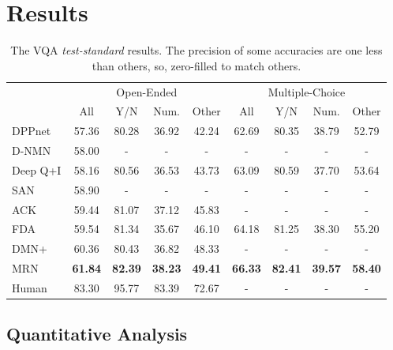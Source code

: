 \documentclass{article}
\begin{document}
\section{Results}
\label{sec:results}

\begin{table}[t!]
\caption{The VQA \textit{test-standard} results. The precision of some accuracies \cite{Yang2015,Andreas2016} are one less than others, so, zero-filled to match others.}
\label{tab:results-std}
\centering
\begin{tabular}{l c c c c c c c c}
\toprule
& \multicolumn{4}{c}{Open-Ended} & \multicolumn{4}{c}{ Multiple-Choice} \\
\cmidrule{2-5}
\cmidrule{6-9}
 & All & Y/N & Num. & Other & All & Y/N & Num. & Other \\
\midrule
DPPnet \cite{Noh2015} \hspace{7pt}
         & 57.36 & 80.28 & 36.92 & 42.24
         & 62.69 & 80.35 & 38.79 & 52.79 \\
D-NMN \cite{Andreas2016}
         & 58.00 & - & - & -
         & - & - & - & - \\
Deep Q+I \cite{Lu2015} \hspace{6pt}
         & 58.16 & 80.56 & 36.53 & 43.73 
         & 63.09 & 80.59 & 37.70 & 53.64 \\
SAN   \cite{Yang2015}
         & 58.90 & - & - & -
         & - & - & - & - \\
ACK   \cite{Wu2016}
         & 59.44 & 81.07 & 37.12 & 45.83
         & - & - & - & - \\
FDA   \cite{Ilievski2016}
         & 59.54 & 81.34 & 35.67 & 46.10
         & 64.18 & 81.25 & 38.30 & 55.20  \\
DMN+ \cite{Xiong2016}
         & 60.36 & 80.43 & 36.82 & 48.33
         & - & - & - & - \\
\midrule
MRN 
         & \textbf{61.84} & \textbf{82.39} & \textbf{38.23} & \textbf{49.41}
         & \textbf{66.33} & \textbf{82.41} & \textbf{39.57} & \textbf{58.40} \\
\midrule
Human \cite{Antol2015} 
         & 83.30 & 95.77 & 83.39 & 72.67 
         & - & - & - & - \\
\bottomrule
\end{tabular}
\end{table}

\subsection{Quantitative Analysis}
\end{document}

